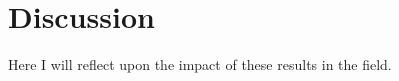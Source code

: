\documentclass[12pt]{article}
\begin{document}
\section{Discussion}
\label{sec:disc}

Here I will reflect upon the impact of these results in the field. 

\lipsum[2]



\end{document}
